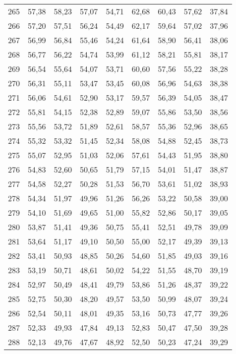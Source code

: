 \begin{longtable}{c c c c c c c c c}
265	& 57,38	& 58,23	& 57,07	& 54,71	& 62,68	& 60,43	& 57,62	& 37,84 \\
266	& 57,20	& 57,51	& 56,24	& 54,49	& 62,17	& 59,64	& 57,02	& 37,96 \\
267	& 56,99	& 56,84	& 55,46	& 54,24	& 61,64	& 58,90	& 56,41	& 38,06 \\
268	& 56,77	& 56,22	& 54,74	& 53,99	& 61,12	& 58,21	& 55,81	& 38,17 \\
269	& 56,54	& 55,64	& 54,07	& 53,71	& 60,60	& 57,56	& 55,22	& 38,28 \\
270	& 56,31	& 55,11	& 53,47	& 53,45	& 60,08	& 56,96	& 54,63	& 38,38 \\
271	& 56,06	& 54,61	& 52,90	& 53,17	& 59,57	& 56,39	& 54,05	& 38,47 \\
272	& 55,81	& 54,15	& 52,38	& 52,89	& 59,07	& 55,86	& 53,50	& 38,56 \\
273	& 55,56	& 53,72	& 51,89	& 52,61	& 58,57	& 55,36	& 52,96	& 38,65 \\
274	& 55,32	& 53,32	& 51,45	& 52,34	& 58,08	& 54,88	& 52,45	& 38,73 \\
275	& 55,07	& 52,95	& 51,03	& 52,06	& 57,61	& 54,43	& 51,95	& 38,80 \\
276	& 54,83	& 52,60	& 50,65	& 51,79	& 57,15	& 54,01	& 51,47	& 38,87 \\
277	& 54,58	& 52,27	& 50,28	& 51,53	& 56,70	& 53,61	& 51,02	& 38,93 \\
278	& 54,34	& 51,97	& 49,96	& 51,26	& 56,26	& 53,22	& 50,58	& 39,00 \\
279	& 54,10	& 51,69	& 49,65	& 51,00	& 55,82	& 52,86	& 50,17	& 39,05 \\
280	& 53,87	& 51,41	& 49,36	& 50,75	& 55,41	& 52,51	& 49,78	& 39,09 \\
281	& 53,64	& 51,17	& 49,10	& 50,50	& 55,00	& 52,17	& 49,39	& 39,13 \\
282	& 53,41	& 50,93	& 48,85	& 50,26	& 54,60	& 51,85	& 49,03	& 39,16 \\
283	& 53,19	& 50,71	& 48,61	& 50,02	& 54,22	& 51,55	& 48,70	& 39,19 \\
284	& 52,97	& 50,49	& 48,41	& 49,79	& 53,86	& 51,26	& 48,37	& 39,22 \\
285	& 52,75	& 50,30	& 48,20	& 49,57	& 53,50	& 50,99	& 48,07	& 39,24 \\
286	& 52,54	& 50,11	& 48,01	& 49,35	& 53,16	& 50,73	& 47,77	& 39,26 \\
287	& 52,33	& 49,93	& 47,84	& 49,13	& 52,83	& 50,47	& 47,50	& 39,28 \\
288	& 52,13	& 49,76	& 47,67	& 48,92	& 52,50	& 50,23	& 47,24	& 39,29 \\

\end{longtable}
